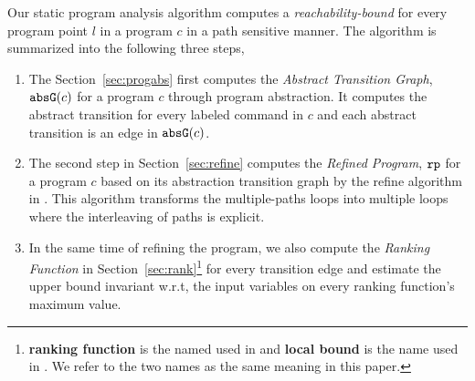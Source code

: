 Our static program analysis algorithm computes 
a \emph{reachability-bound} for every program point $l$ in a program $c$ in a path sensitive manner.
The algorithm is summarized into the following three steps,
\begin{enumerate}
\item  The Section~\ref{sec:progabs} first 
computes the \emph{Abstract Transition Graph}, $\mathtt{abs}{\mathtt{G}}(c)$ for a program $c$ through program abstraction.
It computes the abstract transition 
for every labeled command in $c$ and each abstract transition is an edge in $\mathtt{abs}{\mathtt{G}}(c)$.
\item The second step in Section~\ref{sec:refine}
computes the \emph{Refined Program}, $\mathtt{rp}$ for a program $c$ based on 
its abstraction transition graph by the refine algorithm in \cite{GulwaniJK09}.
This algorithm transforms the multiple-paths loops
into multiple loops where
the interleaving of paths is explicit.
\item In the same time of refining the program, we also compute the \emph{Ranking Function} in Section~\ref{sec:rank}\footnote{\textbf{ranking function} is the named used in \cite{SinnZV14}
and \textbf{local bound} is the name used in \cite{ZulegerGSV11, SinnZV17}.
We refer to the two names as the same meaning in this paper.}  for every transition edge 
and estimate the upper bound invariant w.r.t, the input variables on every ranking function's maximum value.


\end{enumerate}
